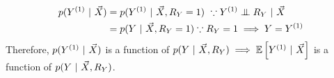 \tftrue 
\begin{align*}
    p(Y^{(1)} ~\vert~ \vec{X}) &= p(Y^{(1)} ~\vert~ \vec{X}, R_Y = 1) ~\because Y^{(1)} \mathrel{\perp\mkern-10mu\perp} R_Y ~\vert~ \vec{X}\\
        &= p(Y ~\vert~ \vec{X}, R_Y = 1) \because R_Y = 1 \implies Y = Y^{(1)} 
\end{align*}
Therefore, $p(Y^{(1)} ~\vert~ \vec{X})$ is a function of $p(Y ~\vert~ \vec{X}, R_Y) \implies \mathbb{E}\left[Y^{(1)} ~\vert~ \vec{X}\right]$ is a function of $p(Y ~\vert~ \vec{X}, R_Y)$.